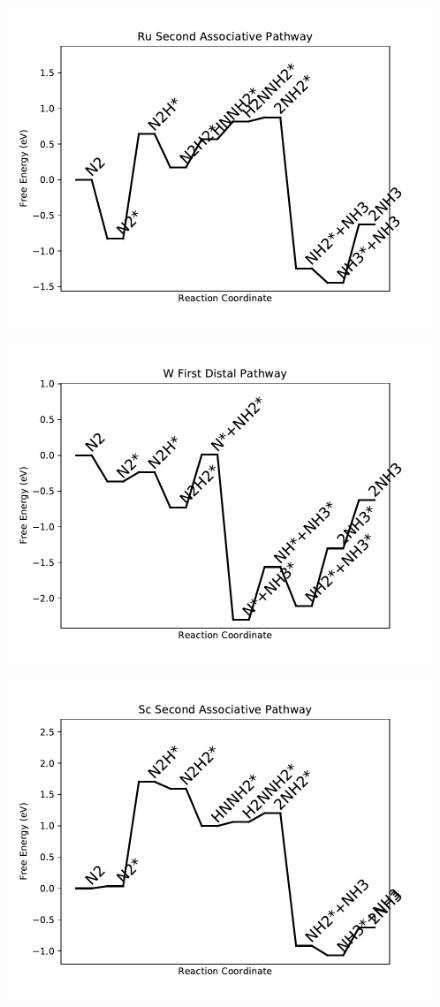 \begin{figure}
\includegraphics[width=0.8\linewidth]{data/plots/Ru_associative_2.pdf}
\end{figure}

\begin{figure}
\includegraphics[width=0.8\linewidth]{data/plots/W_distal_1.pdf}
\end{figure}

\begin{figure}
\includegraphics[width=0.8\linewidth]{data/plots/Sc_associative_2.pdf}
\end{figure}

